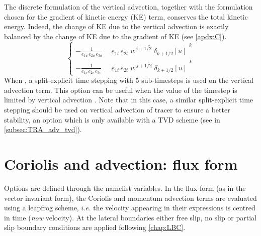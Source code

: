 \documentclass[../tex_main/NEMO_manual]{subfiles}
\begin{document}
The discrete formulation of the vertical advection, together with the formulation 
chosen for the gradient of kinetic energy (KE) term, conserves the total kinetic 
energy. Indeed, the change of KE due to the vertical advection is exactly 
balanced by the change of KE due to the gradient of KE (see \autoref{apdx:C}).
\begin{equation} \label{eq:dynzad}
\left\{ 		\begin{aligned}
-\frac{1} {e_{1u}\,e_{2u}\,e_{3u}} &\ \overline{\ \overline{ e_{1t}\,e_{2t}\;w } ^{\,i+1/2}  \;\delta _{k+1/2} \left[ u \right]\  }^{\,k}  \\
-\frac{1} {e_{1v}\,e_{2v}\,e_{3v}}  &\ \overline{\ \overline{ e_{1t}\,e_{2t}\;w } ^{\,j+1/2}  \;\delta _{k+1/2} \left[ u \right]\  }^{\,k} 
\end{aligned}         \right.
\end{equation} 
When , a split-explicit time stepping with 5 sub-timesteps is used 
on the vertical advection term.
This option can be useful when the value of the timestep is limited by vertical advection \citep{Lemarie_OM2015}. 
Note that in this case, a similar split-explicit time stepping should be used on 
vertical advection of tracer to ensure a better stability, 
an option which is only available with a TVD scheme (see  in \autoref{subsec:TRA_adv_tvd}).


\section{Coriolis and advection: flux form}
\label{sec:DYN_adv_cor_flux}

Options are defined through the  namelist variables.
In the flux form (as in the vector invariant form), the Coriolis and momentum 
advection terms are evaluated using a leapfrog scheme, $i.e.$ the velocity 
appearing in their expressions is centred in time (\textit{now} velocity). At the 
lateral boundaries either free slip, no slip or partial slip boundary conditions 
are applied following \autoref{chap:LBC}.
\end{document}
